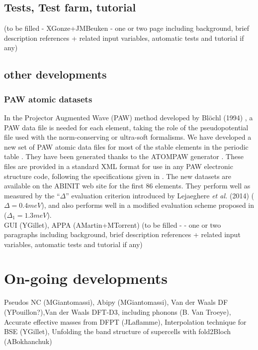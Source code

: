 \documentclass{elsart}
\begin{document}
\subsection{Tests, Test farm, tutorial}
(to be filled - XGonze+JMBeuken - one or two page including background, brief description references + related input variables, automatic tests and tutorial if any)

\subsection{other developments}
 
\subsubsection {PAW atomic datasets}
In the Projector Augmented Wave (PAW) method developed by Bl\"{o}chl (1994) \cite{Bloechl94}, a PAW data file is needed for each element, taking the role of the pseudopotential file used with the norm-conserving  or ultra-soft formalisms.
We have developed a new set of PAW atomic data files for most of the stable 
elements in the periodic table \cite{Jollet14}. They have been generated thanks 
to the ATOMPAW generator \cite{Holzwarth01}. These files are provided in a 
standard XML format for use in any PAW electronic structure code, following the 
specifications given in \cite{XML}. The new datasets are available on the ABINIT 
web site \cite{web3} for the first 86 elements. They perform well as measured by 
the ``$\Delta$'' evaluation criterion introduced by Lejaeghere {\em{et al.}} 
(2014)\cite{Lejaeghere14} ($\Delta=0.4 meV$), and also performs well in a 
modified evaluation scheme proposed in \cite{Jollet14} ($\Delta_{1}=1.3 meV$).\\

GUI (YGillet), APPA (AMartin+MTorrent)
(to be filled -  - one or two paragraphs including background, brief description references + related input variables, automatic tests and tutorial if any)



\newpage
\section{On-going developments}

Pseudos NC (MGiantomassi), Abipy (MGiantomassi),
Van der Waals DF (YPouillon?),Van der Waals DFT-D3, including phonons (B. Van Troeye),
Accurate effective masses from DFPT (JLaflamme),
Interpolation technique for BSE (YGillet),
Unfolding the band structure of supercells with fold2Bloch (ABokhanchuk)
\end{document}
